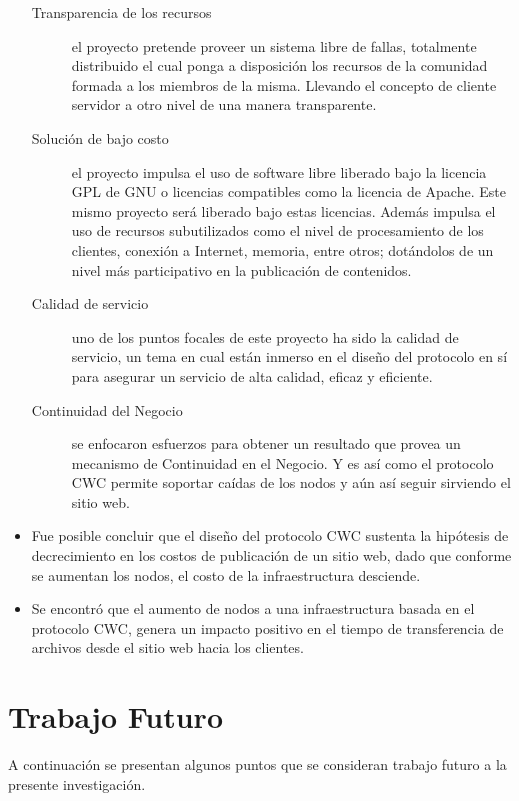 \begin{itemize}
	\begin{description}
	\item[Transparencia de los recursos] el proyecto pretende proveer un sistema libre de fallas, totalmente distribuido el cual ponga a disposición los recursos de la comunidad formada a los miembros de la misma. Llevando el concepto de cliente servidor a otro nivel de una manera transparente. 
	
	\item [Solución de bajo costo] el proyecto impulsa el uso de software libre liberado bajo la licencia GPL de GNU o licencias compatibles como la licencia de Apache. Este mismo proyecto será liberado bajo estas licencias. Además impulsa el uso de recursos subutilizados como el nivel de procesamiento de los clientes, conexión a Internet, memoria, entre otros; dotándolos de un nivel más participativo en la publicación de contenidos.
	
	\item [Calidad de servicio] uno de los puntos focales de este proyecto ha sido la calidad de servicio, un tema en cual están inmerso en el diseño del protocolo en sí para asegurar un servicio de alta calidad, eficaz y eficiente. 
	
	\item [Continuidad del Negocio] se enfocaron esfuerzos para obtener un resultado que provea un mecanismo de Continuidad en el Negocio. Y es así como el protocolo CWC permite soportar caídas de los nodos y aún así seguir sirviendo el sitio web.
	\end{description}
	
\item Fue posible concluir que el diseño del protocolo CWC sustenta la hipótesis de decrecimiento en los costos de publicación de un sitio web, dado que conforme se aumentan los nodos, el costo de la infraestructura desciende. 

\item Se encontró que el aumento de nodos a una infraestructura basada en el protocolo CWC, genera un impacto positivo en el tiempo de transferencia de archivos desde el sitio web hacia los clientes.

\end{itemize}


\section{Trabajo Futuro}
A continuación se presentan algunos puntos que se consideran trabajo futuro a la presente investigación. 

